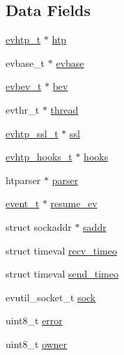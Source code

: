 \subsection*{\-Data \-Fields}
\begin{DoxyCompactItemize}
\item 
\hyperlink{evhtp_8h_aa670c92d77f9a732e03a7d48ada2b31b}{evhtp\-\_\-t} $\ast$ \hyperlink{structevhtp__connection__s_ad2f5cc5c9e97f75f1fe923c57af9e875}{htp}
\item 
evbase\-\_\-t $\ast$ \hyperlink{structevhtp__connection__s_abc4ce26b166a97e5766105f253a4fe21}{evbase}
\item 
\hyperlink{evhtp_8h_af92ce7197ff545dc83b76f1650bc57e1}{evbev\-\_\-t} $\ast$ \hyperlink{structevhtp__connection__s_a56cc56e5934366a7ca14026f5be0b3dd}{bev}
\item 
evthr\-\_\-t $\ast$ \hyperlink{structevhtp__connection__s_aaf924ac18ad3dd26c8676d835116579e}{thread}
\item 
\hyperlink{evhtp_8h_a85b31561e6827b118669d514fe00aa3d}{evhtp\-\_\-ssl\-\_\-t} $\ast$ \hyperlink{structevhtp__connection__s_a9d5e6d2a2098e174347708a6d561b2ec}{ssl}
\item 
\hyperlink{evhtp_8h_ac77d779459ec62f309d1fb09c5540786}{evhtp\-\_\-hooks\-\_\-t} $\ast$ \hyperlink{structevhtp__connection__s_ac97663394f74c9030e57c771cfb7981e}{hooks}
\item 
htparser $\ast$ \hyperlink{structevhtp__connection__s_accaeb42c4c926437fc7921fa7910911b}{parser}
\item 
\hyperlink{evhtp_8h_ad0c066ffb009d3286186a124d37a0c2d}{event\-\_\-t} $\ast$ \hyperlink{structevhtp__connection__s_a7a583b9c2322f322b8785b9cff0e9585}{resume\-\_\-ev}
\item 
struct sockaddr $\ast$ \hyperlink{structevhtp__connection__s_a95957a2d67e88843dae4b71c658b6ecb}{saddr}
\item 
struct timeval \hyperlink{structevhtp__connection__s_a485801666b7fb0cccc50d9fa42e5cbb9}{recv\-\_\-timeo}
\item 
struct timeval \hyperlink{structevhtp__connection__s_a7ffa291d73974047489f8880e5363603}{send\-\_\-timeo}
\item 
evutil\-\_\-socket\-\_\-t \hyperlink{structevhtp__connection__s_a7544570bf388a535223a1e8e1b2301ac}{sock}
\item 
uint8\-\_\-t \hyperlink{structevhtp__connection__s_adc64ccb7538429fe78e3fe0139267370}{error}
\item 
uint8\-\_\-t \hyperlink{structevhtp__connection__s_a1c3b8d8797515eea0e86cbdb2d85aed6}{owner}

\end{DoxyCompactItemize}
